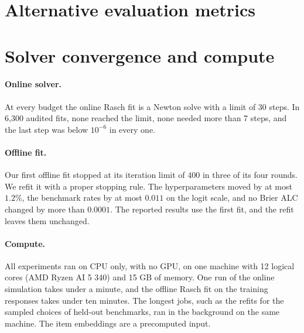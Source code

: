 \documentclass{article}
\begin{document}
\section{Alternative evaluation metrics}\label{app:alternative-metrics}
\begin{table}[H]
  \centering\small
  \caption{Competition-shaped online simulation; models are labelled as in Section~\ref{sec:results}. Brier, log loss, and ten-bin task ECE are averaged using the official budget weights; lower is better. AUC uses within-task item rankings at 31 labels, where higher is better. Dashes indicate no informative ranking; a constant prediction ties all items. Bold: best in each split (lowest loss, highest AUC). Per-budget AUC and alternative weights are reported in the accompanying CSVs.}
  
\end{table}

\section{Solver convergence and compute}\label{app:convergence}
\paragraph{Online solver.} At every budget the online Rasch fit is a Newton solve with a limit of 30 steps. In 6,300 audited fits, none reached the limit, none needed more than 7 steps, and the last step was below $10^{-6}$ in every one.

\paragraph{Offline fit.} Our first offline fit stopped at its iteration limit of 400 in three of its four rounds. We refit it with a proper stopping rule. The hyperparameters moved by at most $1.2\%$, the benchmark rates by at most $0.011$ on the logit scale, and no Brier ALC changed by more than $0.0001$. The reported results use the first fit, and the refit leaves them unchanged.

\paragraph{Compute.} All experiments ran on CPU only, with no GPU, on one machine with 12 logical cores (AMD Ryzen AI 5 340) and 15 GB of memory. One run of the online simulation takes under a minute, and the offline Rasch fit on the training responses takes under ten minutes. The longest jobs, such as the refits for the sampled choices of held-out benchmarks, ran in the background on the same machine. The item embeddings are a precomputed input.
\end{document}
